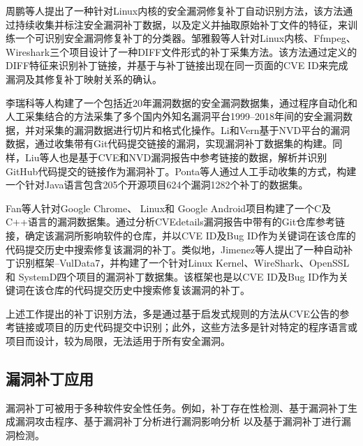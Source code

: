 周鹏等人\cite{9周鹏2022一种}提出了一种针对Linux内核的安全漏洞修复补丁自动识别方法，该方法通过持续收集并标注安全漏洞补丁数据，以及定义并抽取原始补丁文件的特征，来训练一个可识别安全漏洞修复补丁的分类器。邹雅毅等人\cite{7邹雅毅2016开源软件漏洞补丁的采集与整理}针对Linux内核、Ffmpeg、Wireshark三个项目设计了一种DIFF文件形式的补丁采集方法。该方法通过定义的DIFF特征来识别补丁链接，并基于与补丁链接出现在同一页面的CVE ID来完成漏洞及其修复补丁映射关系的确认。

李瑞科等人\cite{10李瑞科20191999}构建了一个包括近20年漏洞数据的安全漏洞数据集，通过程序自动化和人工采集结合的方法采集了多个国内外知名漏洞平台1999–2018年间的安全漏洞数据，并对采集的漏洞数据进行切片和格式化操作。Li和Vern\cite{li2017large}基于NVD平台的漏洞数据，通过收集带有Git代码提交链接的漏洞，实现漏洞补丁数据集的构建。同样，Liu等人\cite{liu2020large}也是基于CVE和NVD漏洞报告中参考链接的数据，解析并识别GitHub代码提交的链接作为漏洞补丁。Ponta等人\cite{ponta2019manually}通过人工手动收集的方式，构建一个针对Java语言包含205个开源项目624个漏洞1282个补丁的数据集。

Fan等人\cite{fan2020ac}针对Google Chrome、 Linux和 Google Android项目构建了一个C及C++语言的漏洞数据集。通过分析CVEdetails漏洞报告中带有的Git仓库参考链接，确定该漏洞所影响软件的仓库，并以CVE ID及Bug ID作为关键词在该仓库的代码提交历史中搜索修复该漏洞的补丁。类似地，Jimenez等人\cite{jimenez2018enabling}提出了一种自动补丁识别框架--VulData7，并构建了一个针对Linux Kernel、WireShark、OpenSSL和 SystemD四个项目的漏洞补丁数据集。该框架也是以CVE ID及Bug ID作为关键词在该仓库的代码提交历史中搜索修复该漏洞的补丁。

上述工作提出的补丁识别方法，多是通过基于启发式规则的方法从CVE公告的参考链接或项目的历史代码提交中识别；此外，这些方法多是针对特定的程序语言或项目而设计，较为局限，无法适用于所有安全漏洞。


\subsection{漏洞补丁应用}
漏洞补丁可被用于多种软件安全性任务。例如，补丁存在性检测\cite{8文琪2020}、基于漏洞补丁生成漏洞攻击程序\cite{brumley2008automatic,you2017semfuzz}、基于漏洞补丁分析进行漏洞影响分析\cite{4李舟军2015软件安全漏洞检测技术,5李韵2020基于机器学习的软件漏洞挖掘方法综述,pashchenko2018vulnerable,ponta2020detection,pashchenko2020vuln4real,Wang2020empirical} 以及基于漏洞补丁进行漏洞检测\cite{li2016vulpecker,li2018vuldeepecker,zhou2019devign,jimenez2019importance}。%

